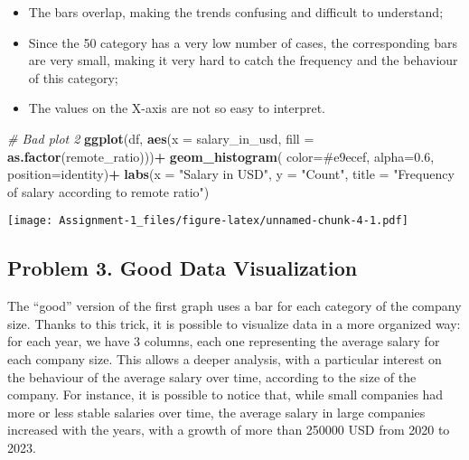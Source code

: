 \documentclass[
]{article}
\newenvironment{Shaded}{\begin{snugshade}}{\end{snugshade}}
\newcommand{\AttributeTok}[1]{\textcolor[rgb]{0.13,0.29,0.53}{#1}}
\newcommand{\CommentTok}[1]{\textcolor[rgb]{0.56,0.35,0.01}{\textit{#1}}}
\newcommand{\FloatTok}[1]{\textcolor[rgb]{0.00,0.00,0.81}{#1}}
\newcommand{\FunctionTok}[1]{\textcolor[rgb]{0.13,0.29,0.53}{\textbf{#1}}}
\newcommand{\NormalTok}[1]{#1}
\newcommand{\SpecialCharTok}[1]{\textcolor[rgb]{0.81,0.36,0.00}{\textbf{#1}}}
\newcommand{\StringTok}[1]{\textcolor[rgb]{0.31,0.60,0.02}{#1}}
\begin{document}
\begin{itemize}
\item
  The bars overlap, making the trends confusing and difficult to
  understand;
\item
  Since the 50 category has a very low number of cases, the
  corresponding bars are very small, making it very hard to catch the
  frequency and the behaviour of this category;
\item
  The values on the X-axis are not so easy to interpret.
\end{itemize}

\begin{Shaded}
\begin{Highlighting}[]
\CommentTok{\# Bad plot 2}
\FunctionTok{ggplot}\NormalTok{(df, }\FunctionTok{aes}\NormalTok{(}\AttributeTok{x =}\NormalTok{ salary\_in\_usd, }\AttributeTok{fill =} \FunctionTok{as.factor}\NormalTok{(remote\_ratio)))}\SpecialCharTok{+}
  \FunctionTok{geom\_histogram}\NormalTok{( }\AttributeTok{color=}\StringTok{\textquotesingle{}\#e9ecef\textquotesingle{}}\NormalTok{, }\AttributeTok{alpha=}\FloatTok{0.6}\NormalTok{, }\AttributeTok{position=}\StringTok{\textquotesingle{}identity\textquotesingle{}}\NormalTok{)}\SpecialCharTok{+}
  \FunctionTok{labs}\NormalTok{(}\AttributeTok{x =} \StringTok{"Salary in USD"}\NormalTok{, }\AttributeTok{y =} \StringTok{"Count"}\NormalTok{, }\AttributeTok{title =} \StringTok{"Frequency of salary according to remote ratio"}\NormalTok{)}
\end{Highlighting}
\end{Shaded}

\texttt{[image: Assignment-1\_files/figure-latex/unnamed-chunk-4-1.pdf]}

\hypertarget{problem-3.-good-data-visualization}{%
\subsection{Problem 3. Good Data
Visualization}\label{problem-3.-good-data-visualization}}

The ``good'' version of the first graph uses a bar for each category of
the company size. Thanks to this trick, it is possible to visualize data
in a more organized way: for each year, we have 3 columns, each one
representing the average salary for each company size. This allows a
deeper analysis, with a particular interest on the behaviour of the
average salary over time, according to the size of the company. For
instance, it is possible to notice that, while small companies had more
or less stable salaries over time, the average salary in large companies
increased with the years, with a growth of more than 250000 USD from
2020 to 2023. \newline
\end{document}
